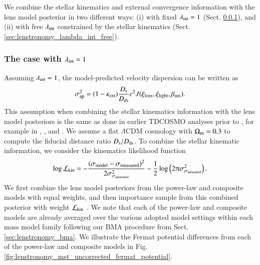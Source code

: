 \documentclass[longauth]{aa}
\newcommand{\Ds}{D_{\rm s}}
\newcommand{\Dds}{D_{\rm ds}}
\newcommand{\ajs}[1]{{{#1}}}
\begin{document}
We combine the stellar kinematics and external convergence information with the lens model posterior in two different ways: (i) with fixed $\lambda_{\rm int} = 1$ (Sect. \ref{sec:lenstronomy_lambda_int_fixed}), and (ii) with free $\lambda_{\rm int}$ constrained by the stellar kinematics (Sect. \ref{sec:lenstronomy_lambda_int_free}).

\subsubsection{The case with $\lambda_{\rm int} = 1$} \label{sec:lenstronomy_lambda_int_fixed}

Assuming $\lambda_{\rm int} = 1$, the model-predicted velocity dispersion can be written as
%
\begin{equation}
        \sigma_{\rm ap}^2 = (1 - \kappa_{\rm ext}) \frac{\Ds}{\Dds} c^2 J(\xi_{\rm lens}, \xi_{\rm light}, \beta_{\rm ani}).
\end{equation}
%
This assumption when combining the stellar kinematics information with the lens model posteriors is the same as done in earlier TDCOSMO analyses prior to \citet[][TDCOSMO-IV]{Birrer20}, for example in \citet{Suyu13}, \citet{Wong17}, and \citet{Rusu20}. We assume a flat $\Lambda$CDM cosmology with $\Omega_{\rm m} = 0.3$ to compute the fiducial distance ratio $\Ds/\Dds$. To combine the stellar kinematic information, we consider the kinematics likelihood function
%
\begin{equation} \label{eq:lenstronomy_kinematic_likelihood}
        \log \mathcal{L}_{\rm kin} = - \frac{\left(\sigma_{\rm model} - \sigma_{\rm measured}\right)^2}{2 \sigma_{\sigma_{\rm measured}}^2} - \frac{1}{2} \log \left(2 \uppi \sigma_{\sigma_{\rm measured}}^2\right).
\end{equation}
%
We first combine the lens model posteriors from the power-law and composite models with equal weights, and then importance sample from this combined posterior with weight $\mathcal{L}_{\rm kin}$ \citep{Lewis02}. We note that each of the power-law and composite models are already averaged over the various adopted model settings within each mass model family following our BMA procedure from Sect. \ref{sec:lenstronomy_bma}. We illustrate the Fermat potential differences from each of the power-law and composite models in Fig. \ref{fig:lenstronomy_mst_uncorrected_fermat_potential}. \ajs{}
\end{document}
